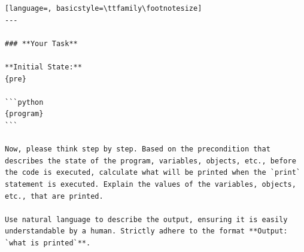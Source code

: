 \documentclass[sigconf]{acmart}
\begin{document}
\begin{tcolorbox}[ colback=gray!10, colframe=black, arc=5pt]
\begin{lstlisting}[language=, basicstyle=\ttfamily\footnotesize]
---

### **Your Task**

**Initial State:**  
{pre}

```python
{program}
```

Now, please think step by step. Based on the precondition that describes the state of the program, variables, objects, etc., before the code is executed, calculate what will be printed when the `print` statement is executed. Explain the values of the variables, objects, etc., that are printed.

Use natural language to describe the output, ensuring it is easily understandable by a human. Strictly adhere to the format **Output: `what is printed`**.

\end{lstlisting}
\end{tcolorbox}

\clearpage
\flushbottom
\end{document}
